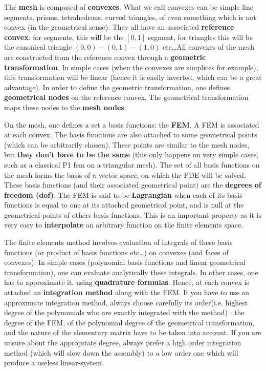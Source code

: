 The \textbf{mesh} is composed of
\textbf{convexes}. What we call convexes can be simple
line segments, prisms, tetrahedrons, curved triangles, of even
something which is not convex (in the geometrical sense). They all
have an associated \textbf{reference convex}:
for segments, this will be the $[0,1]$ segment, for triangles this
will be the canonical triangle $(0,0)-(0,1)-(1,0)$ etc\ldots All convexes
of the mesh are constructed from the reference convex through a
\textbf{geometric transformation}. In
simple cases (when the convexes are simplices for example), this
transformation will be linear (hence it is easily inverted, which can
be a great advantage). In order to define the geometric
transformation, one defines \textbf{geometrical
  nodes} on the reference convex. The
geometrical transformation maps these nodes to the \textbf{mesh
  nodes}.

On the mesh, one defines a set a basis functions: the
\textbf{FEM}. A FEM is associated at each convex. The basis
functions are also attached to some geometrical points (which can be
arbitrarily chosen). These points are similar to the mesh nodes, but
\textbf{they don't have to be the same} (this only happens on very
simple cases, such as a classical P1 fem on a triangular mesh). The
set of all basis functions on the mesh forms the basis of a vector
space, on which the PDE will be solved. These basis functions (and
their associated geometrical point) are the \textbf{degrees of freedom
  (dof)}. The FEM is said to be
\textbf{Lagrangian} when each of its basis functions
is equal to one at its attached geometrical point, and is null at the
geometrical points of others basis functions. This is an important
property as it is very easy to
\textbf{interpolate} an arbitrary function on the
finite elements space.

The finite elements method involves evaluation of integrals of these
basis functions (or product of basis functions etc\ldots) on convexes (and
faces of convexes). In simple cases (polynomial basis functions and
linear geometrical transformation), one can evaluate analytically
these integrals. In other cases, one has to approximate it, using
\textbf{quadrature formulas}. Hence, at
each convex is attached an \textbf{integration
  method} along with the FEM.  If you have
to use an approximate integration method, always choose carefully its
order(i.e. highest degree of the polynomials who are exactly
integrated with the method) : the degree of the FEM, of the polynomial
degree of the geometrical transformation, and the nature of the
elementary matrix have to be taken into account. If you are unsure
about the appropriate degree, always prefer a high order integration
method (which will slow down the assembly) to a low order one which
will produce a useless linear-system.

